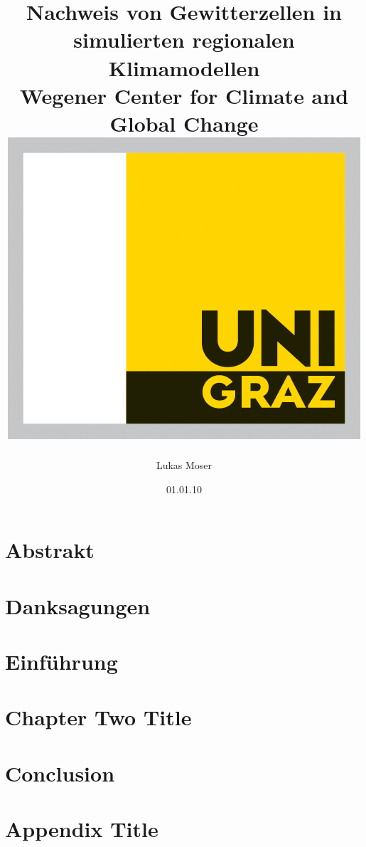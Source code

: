 \documentclass[12pt,twoside]{report}
\title{
	{Nachweis von Gewitterzellen in simulierten regionalen Klimamodellen}\\
	{\large Wegener Center for Climate and Global Change}\\
	{\includegraphics{university.jpg}}
}
\author{Lukas Moser}
\date{01.01.10}
\begin{document}
	\maketitle
	\pagestyle{fancy}
	\chapter*{Abstrakt}
	
	\chapter*{Danksagungen}
	
	\tableofcontents
	
	\chapter{Einführung}
	

	\chapter{Chapter Two Title}
	
	
	
	\chapter{Conclusion}
	
	
	\appendix
	\chapter{Appendix Title}
	
	
\end{document}
